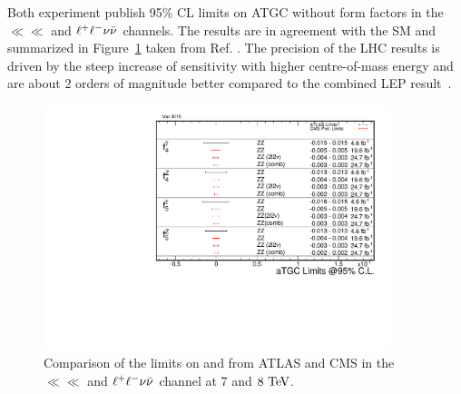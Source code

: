 Both experiment publish 95\% CL limits on ATGC without form factors in the $\ll\ll$ 
and $\ell^+ \ell^-\nu\bar{\nu}$ channels. The results are in agreement with the SM and 
summarized in Figure~\ref{fig:sss-inclboson-diboson-zzprod-aTGC_naTGCf} 
taken from Ref. \cite{aTGCplots}. The precision of the LHC results is driven by the steep increase of 
sensitivity with higher centre-of-mass energy
and are about 2 orders of magnitude better compared to the 
combined LEP result~\cite{LEP-comb-2002}.  
\begin{figure}[htbp]
  \begin{center}
  \includegraphics[width=0.9\textwidth]{figures/sss-inclboson-diboson-zzprod-aTGC_naTGCf.pdf}
  \caption{ Comparison of the limits on \ffourv{} and \ffivev{} from ATLAS and CMS in the $\ll\ll$ and $\ell^+ \ell^-\nu\bar{\nu}$
  channel at 7 and $8\TeV$.}
\label{fig:sss-inclboson-diboson-zzprod-aTGC_naTGCf}
\end{center}
\end{figure}








